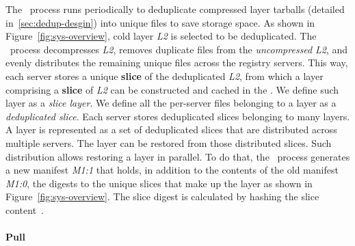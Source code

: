 The \dedupname~process runs periodically to deduplicate compressed layer tarballs (detailed in~\cref{sec:dedup-desgin})
into unique files to save storage space.
As shown in Figure~\ref{fig:sys-overview}, cold layer \textit{L2} is selected to be deduplicated.
The \dedupname~process decompresses \textit{L2}, removes duplicate files from the \emph{uncompressed} \textit{L2}, and  evenly distributes the remaining unique files across the registry servers.
This way, each server stores a 
unique \textbf{slice}
 of the deduplicated \textit{L2}, from which a layer comprising a \textbf{slice} of \textit{L2}
can be constructed and cached in the \preconstructcachename. We define such layer as a {\em slice layer}.
We define all the per-server files belonging to a layer as a {\em deduplicated slice}. 
Each server stores deduplicated slices belonging to many layers. 
A layer is represented as a set of deduplicated slices that are distributed across multiple servers.
The layer can be restored 
from those distributed slices. 
Such distribution allows restoring a layer in parallel.
To do that, the \dedupname~process generates a new manifest \textit{M1:1} that holds, in addition to the contents of the old manifest \textit{M1:0}, the digests to the unique slices %
that make up the layer as shown in Figure~\ref{fig:sys-overview}.
The slice digest is calculated by hashing the slice content~\cite{xxx}.

\paragraph{Pull}

